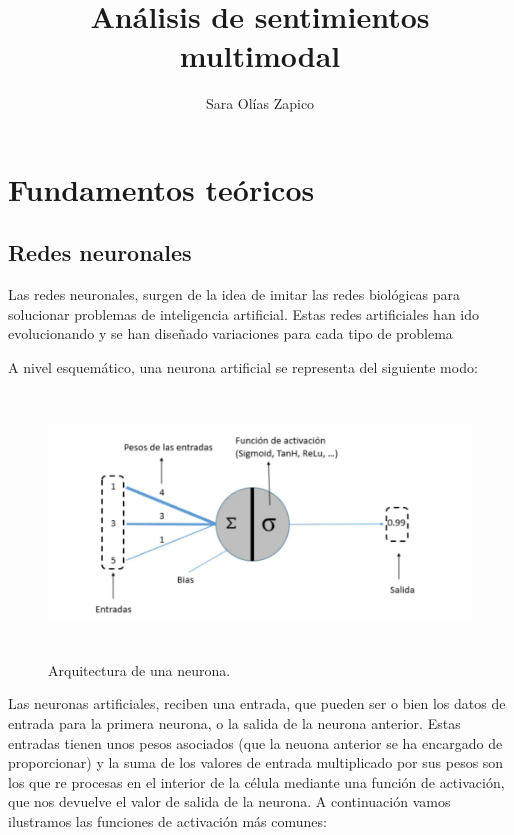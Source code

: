 \documentclass[11pt]{article} %
\title{Análisis de sentimientos multimodal}
\author{Sara Olías Zapico}
\begin{document}
	\maketitle
\renewcommand{\refname}{Bibliografía}

\tableofcontents

\newpage

\section{Fundamentos teóricos}

\subsection{Redes neuronales}

Las redes neuronales, surgen de la idea de imitar las redes biológicas para solucionar problemas de inteligencia artificial. Estas redes artificiales han ido evolucionando y se han diseñado variaciones para cada tipo de problema

A nivel esquemático, una neurona artificial se representa del siguiente modo:


\begin{figure}[h!]
	\centering
	\includegraphics[width=12cm, height=7cm]{nuerona.png}
	\caption{Arquitectura de una neurona.}
\end{figure}

Las neuronas artificiales, reciben una entrada, que pueden ser o bien los datos de entrada para la primera neurona, o la salida de la neurona anterior. Estas entradas tienen unos pesos asociados (que la neuona anterior se ha encargado de proporcionar) y la suma de los valores de entrada multiplicado por sus pesos son los que re procesas en el interior de la célula mediante una función de activación, que nos devuelve el valor de salida de la neurona. A continuación vamos ilustramos las funciones de activación más comunes:
\end{document}
